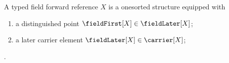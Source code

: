 \begin{struct}\label{typed_field_forward_reference}
    A typed field forward reference $X$ is a onesorted structure equipped with
    \begin{enumerate}
        \item a distinguished point $\fieldFirst[X]\in\fieldLater[X]$;
        \item a later carrier element $\fieldLater[X]\in\carrier[X]$;
    \end{enumerate}
    .
\end{struct}
